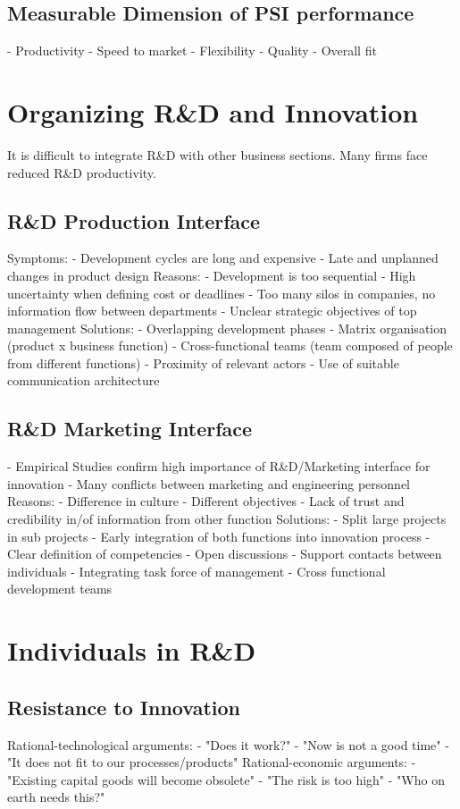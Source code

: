 \documentclass{scrartcl}
\begin{document}
\subsection*{Measurable Dimension of PSI performance}
- Productivity
- Speed to market
- Flexibility
- Quality
- Overall fit

\section*{Organizing R\&D and Innovation}
It is difficult to integrate R\&D with other business sections. Many firms face reduced R\&D productivity.
\subsection*{R\&D Production Interface}
Symptoms:
- Development cycles are long and expensive
- Late and unplanned changes in product design
Reasons:
- Development is too sequential
- High uncertainty when defining cost or deadlines
- Too many silos in companies, no information flow between departments
- Unclear strategic objectives of top management
Solutions:
- Overlapping development phases
- Matrix organisation (product x business function)
- Cross-functional teams (team composed of people from different functions)
- Proximity of relevant actors
- Use of suitable communication architecture
\subsection*{R\&D Marketing Interface}
- Empirical Studies confirm high importance of R\&D/Marketing interface for innovation
- Many conflicts between marketing and engineering personnel
Reasons:
- Difference in culture
- Different objectives
- Lack of trust and credibility in/of information from other function
Solutions:
- Split large projects in sub projects
- Early integration of both functions into innovation process
- Clear definition of competencies
- Open discussions
- Support contacts between individuals
- Integrating task force of management
- Cross functional development teams

\section*{Individuals in R\&D}
\subsection*{Resistance to Innovation}
Rational-technological arguments:
- "Does it work?"
- "Now is not a good time"
- "It does not fit to our processes/products"
Rational-economic arguments:
- "Existing capital goods will become obsolete"
- "The risk is too high"
- "Who on earth needs this?"
\end{document}
